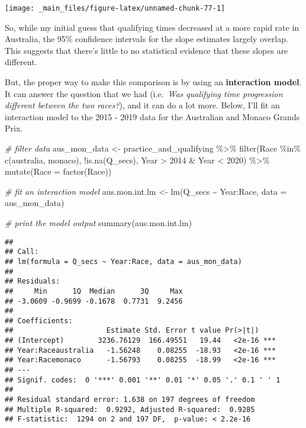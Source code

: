 \documentclass[
]{book}
\newenvironment{Shaded}{\begin{snugshade}}{\end{snugshade}}
\newcommand{\AttributeTok}[1]{\textcolor[rgb]{0.77,0.63,0.00}{#1}}
\newcommand{\CommentTok}[1]{\textcolor[rgb]{0.56,0.35,0.01}{\textit{#1}}}
\newcommand{\DecValTok}[1]{\textcolor[rgb]{0.00,0.00,0.81}{#1}}
\newcommand{\FunctionTok}[1]{\textcolor[rgb]{0.00,0.00,0.00}{#1}}
\newcommand{\NormalTok}[1]{#1}
\newcommand{\OtherTok}[1]{\textcolor[rgb]{0.56,0.35,0.01}{#1}}
\newcommand{\SpecialCharTok}[1]{\textcolor[rgb]{0.00,0.00,0.00}{#1}}
\newcommand{\StringTok}[1]{\textcolor[rgb]{0.31,0.60,0.02}{#1}}
\begin{document}
\begin{center}\texttt{[image: \_main\_files/figure-latex/unnamed-chunk-77-1]} \end{center}

So, while my initial guess that qualifying times decreased at a more rapid rate in Australia, the 95\% confidence intervals for the slope estimates largely overlap. This suggests that there's little to no statistical evidence that these slopes are different.

But, the proper way to make this comparison is by using an \textbf{interaction model}. It can answer the question that we had (i.e.~\emph{Was qualifying time progression different between the two races?}), and it can do a lot more. Below, I'll fit an interaction model to the 2015 - 2019 data for the Australian and Monaco Grands Prix.

\begin{Shaded}
\begin{Highlighting}[]
\CommentTok{\# filter data}
\NormalTok{aus\_mon\_data }\OtherTok{\textless{}{-}}\NormalTok{ practice\_and\_qualifying }\SpecialCharTok{\%\textgreater{}\%}
  \FunctionTok{filter}\NormalTok{(Race }\SpecialCharTok{\%in\%} \FunctionTok{c}\NormalTok{(}\StringTok{\textquotesingle{}australia\textquotesingle{}}\NormalTok{, }\StringTok{\textquotesingle{}monaco\textquotesingle{}}\NormalTok{),}
         \SpecialCharTok{!}\FunctionTok{is.na}\NormalTok{(Q\_secs),}
\NormalTok{         Year }\SpecialCharTok{\textgreater{}} \DecValTok{2014} \SpecialCharTok{\&}\NormalTok{ Year }\SpecialCharTok{\textless{}} \DecValTok{2020}\NormalTok{) }\SpecialCharTok{\%\textgreater{}\%}
  \FunctionTok{mutate}\NormalTok{(}\AttributeTok{Race =} \FunctionTok{factor}\NormalTok{(Race))}

\CommentTok{\# fit an interaction model}
\NormalTok{aus.mon.int.lm }\OtherTok{\textless{}{-}} \FunctionTok{lm}\NormalTok{(Q\_secs }\SpecialCharTok{\textasciitilde{}}\NormalTok{ Year}\SpecialCharTok{:}\NormalTok{Race, }\AttributeTok{data =}\NormalTok{ aus\_mon\_data)}

\CommentTok{\# print the model output}
\FunctionTok{summary}\NormalTok{(aus.mon.int.lm)}
\end{Highlighting}
\end{Shaded}

\begin{verbatim}
## 
## Call:
## lm(formula = Q_secs ~ Year:Race, data = aus_mon_data)
## 
## Residuals:
##     Min      1Q  Median      3Q     Max 
## -3.0609 -0.9699 -0.1678  0.7731  9.2456 
## 
## Coefficients:
##                      Estimate Std. Error t value Pr(>|t|)    
## (Intercept)        3236.76129  166.49551   19.44   <2e-16 ***
## Year:Raceaustralia   -1.56248    0.08255  -18.93   <2e-16 ***
## Year:Racemonaco      -1.56793    0.08255  -18.99   <2e-16 ***
## ---
## Signif. codes:  0 '***' 0.001 '**' 0.01 '*' 0.05 '.' 0.1 ' ' 1
## 
## Residual standard error: 1.638 on 197 degrees of freedom
## Multiple R-squared:  0.9292, Adjusted R-squared:  0.9285 
## F-statistic:  1294 on 2 and 197 DF,  p-value: < 2.2e-16
\end{verbatim}
\end{document}
